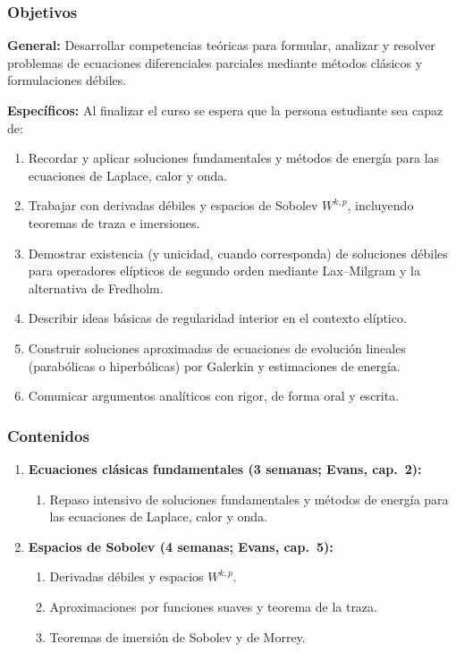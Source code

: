 \begin{refsection}
\subsubsection*{Objetivos}

\textbf{General:} Desarrollar competencias teóricas para formular, analizar y resolver problemas de ecuaciones diferenciales parciales mediante métodos clásicos y formulaciones débiles.

\textbf{Específicos:} Al finalizar el curso se espera que la persona estudiante sea capaz de:

\begin{enumerate}
\item Recordar y aplicar soluciones fundamentales y métodos de energía para las ecuaciones de Laplace, calor y onda.
\item Trabajar con derivadas débiles y espacios de Sobolev $W^{k,p}$, incluyendo teoremas de traza e imersiones.
\item Demostrar existencia (y unicidad, cuando corresponda) de soluciones débiles para operadores elípticos de segundo orden mediante Lax--Milgram y la alternativa de Fredholm.
\item Describir ideas básicas de regularidad interior en el contexto elíptico.
\item Construir soluciones aproximadas de ecuaciones de evolución lineales (parabólicas o hiperbólicas) por Galerkin y estimaciones de energía.
\item Comunicar argumentos analíticos con rigor, de forma oral y escrita.
\end{enumerate}

\subsubsection*{Contenidos}

\begin{enumerate}

\item \textbf{Ecuaciones clásicas fundamentales (3 semanas; Evans, cap.~2):}
\begin{enumerate}
    \item Repaso intensivo de soluciones fundamentales y métodos de energía para las ecuaciones de Laplace, calor y onda.
\end{enumerate}

\item \textbf{Espacios de Sobolev (4 semanas; Evans, cap.~5):}
\begin{enumerate}
    \item Derivadas débiles y espacios $W^{k,p}$.
    \item Aproximaciones por funciones suaves y teorema de la traza.
    \item Teoremas de imersión de Sobolev y de Morrey.
\end{enumerate}


\end{enumerate}
\end{refsection}
